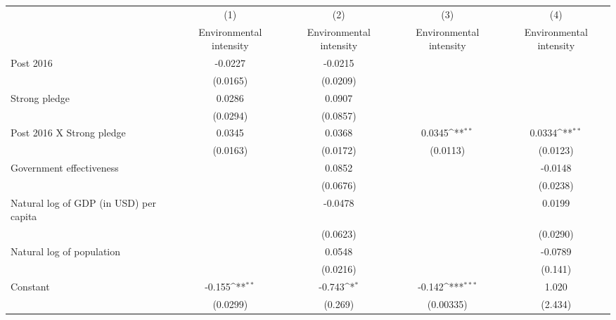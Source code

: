 {
\def\sym#1{\ifmmode^{#1}\else\(^{#1}\)\fi}
\begin{tabular}{l*{4}{c}}
\hline\hline
                    &\multicolumn{1}{c}{(1)}&\multicolumn{1}{c}{(2)}&\multicolumn{1}{c}{(3)}&\multicolumn{1}{c}{(4)}\\
                    &\multicolumn{1}{c}{Environmental intensity}&\multicolumn{1}{c}{Environmental intensity}&\multicolumn{1}{c}{Environmental intensity}&\multicolumn{1}{c}{Environmental intensity}\\
\hline
Post 2016           &     -0.0227         &     -0.0215         &                     &                     \\
                    &    (0.0165)         &    (0.0209)         &                     &                     \\
[1em]
Strong pledge       &      0.0286         &      0.0907         &                     &                     \\
                    &    (0.0294)         &    (0.0857)         &                     &                     \\
[1em]
Post 2016 X Strong pledge&      0.0345         &      0.0368         &      0.0345\sym{**} &      0.0334\sym{**} \\
                    &    (0.0163)         &    (0.0172)         &    (0.0113)         &    (0.0123)         \\
[1em]
Government effectiveness&                     &      0.0852         &                     &     -0.0148         \\
                    &                     &    (0.0676)         &                     &    (0.0238)         \\
[1em]
Natural log of GDP (in USD) per capita&                     &     -0.0478         &                     &      0.0199         \\
                    &                     &    (0.0623)         &                     &    (0.0290)         \\
[1em]
Natural log of population&                     &      0.0548         &                     &     -0.0789         \\
                    &                     &    (0.0216)         &                     &     (0.141)         \\
[1em]
Constant            &      -0.155\sym{**} &      -0.743\sym{*}  &      -0.142\sym{***}&       1.020         \\
                    &    (0.0299)         &     (0.269)         &   (0.00335)         &     (2.434)         \\

\end{tabular}}

